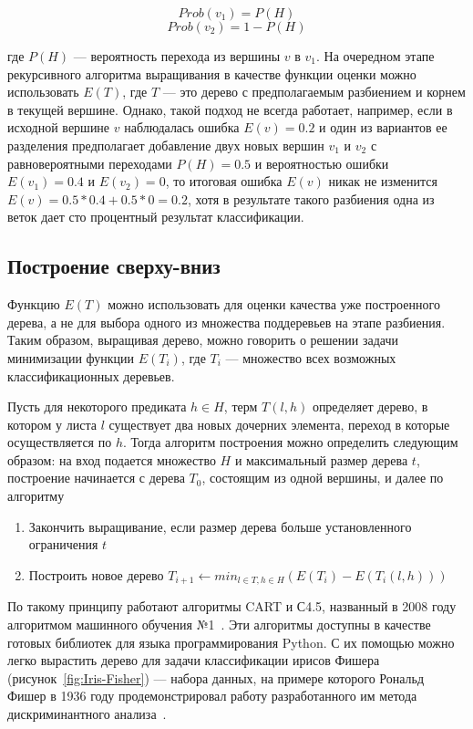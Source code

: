 \documentclass[a4paper,14pt]{extarticle} %
\begin{document}
$$
Prob(v_1) = P(H)
$$
$$
Prob(v_2) = 1 - P(H)
$$

\noindent где $P(H)$ --- вероятность перехода из вершины $v$ в $v_1$. На очередном этапе рекурсивного алгоритма выращивания в качестве функции оценки можно использовать $E(T)$, где $T$ --- это дерево с предполагаемым разбиением и корнем в текущей вершине. Однако, такой подход не всегда работает, например, если в исходной вершине $v$ наблюдалась ошибка $E(v)=0.2$ и один из вариантов ее разделения предполагает добавление двух новых вершин $v_1$ и $v_2$ с равновероятными переходами $P(H)=0.5$ и вероятностью ошибки $E(v_1)=0.4$ и $E(v_2)=0$, то итоговая ошибка $E(v)$ никак не изменится $E(v)=0.5*0.4+0.5*0=0.2$, хотя в результате такого разбиения одна из веток дает сто процентный результат классификации.

\subsection{Построение сверху-вниз}
\hspace{\parindent} Функцию $E(T)$ можно использовать для оценки качества уже построенного дерева, а не для выбора одного из множества поддеревьев на этапе разбиения. Таким образом, выращивая дерево, можно говорить о решении задачи минимизации функции $E(T_i)$, где $T_i$ --- множество всех возможных классификационных деревьев. 

Пусть для некоторого предиката $h \in H$, терм $T(l, h)$ определяет дерево, в котором у листа $l$ существует два новых дочерних элемента, переход в которые осуществляется по $h$. Тогда алгоритм построения можно определить следующим образом: на вход подается множество $H$ и максимальный размер дерева $t$, построение начинается с дерева $T_0$, состоящим из одной вершины, и далее по алгоритму

\begin{enumerate}
\item Закончить выращивание, если размер дерева больше установленного ограничения $t$
\item Построить новое дерево $T_{i+1} \leftarrow min_{l \in T, h \in H}(E(T_i)-E(T_i(l, h)))$
\end{enumerate}

По такому принципу работают алгоритмы CART и С4.5, названный в 2008 году алгоритмом машинного обучения №1~\cite{wu2008top}. Эти алгоритмы доступны в качестве готовых библиотек для языка программирования Python. С их помощью можно легко вырастить дерево для задачи классификации ирисов Фишера (рисунок~\ref{fig:Iris-Fisher}) --- набора данных, на примере которого Рональд Фишер в 1936 году продемонстрировал работу разработанного им метода дискриминантного анализа~\cite{fisher1936use}. 
\end{document}
